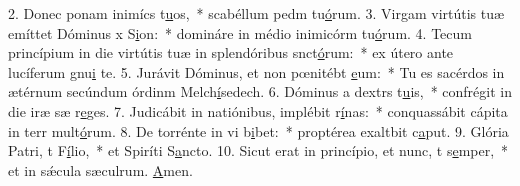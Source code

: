 2. Donec ponam inimícs t\uline{u}os,~* scabéllum pedm tu\uline{ó}rum.
3. Virgam virtútis tuæ emíttet Dóminus x S\uline{i}on:~* domináre in médio inimicórm tu\uline{ó}rum.
4. Tecum princípium in die virtútis tuæ in splendóribus snct\uline{ó}rum:~* ex útero ante lucíferum gnu\uline{i} te.
5. Jurávit Dóminus, et non pœnitébt \uline{e}um:~* Tu es sacérdos in ætérnum secúndum órdinm Melch\uline{í}sedech.
6. Dóminus a dextrs t\uline{u}is,~* confrégit in die iræ sæ r\uline{e}ges.
7. Judicábit in natiónibus, implébit r\uline{í}nas:~* conquassábit cápita in terr mult\uline{ó}rum.
8. De torrénte in vi b\uline{i}bet:~* proptérea exaltbit c\uline{a}put.
9. Glória Patri, t F\uline{í}lio,~* et Spiríti S\uline{a}ncto.
10. Sicut erat in princípio, et nunc, t s\uline{e}mper,~* et in sǽcula sæculrum. \uline{A}men.
